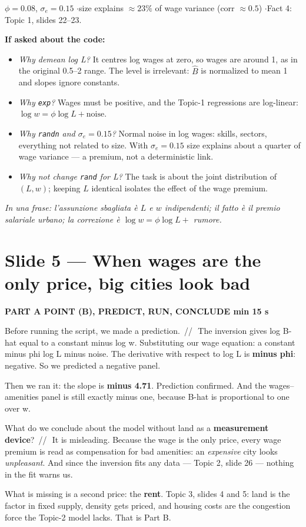 \documentclass[11pt,a4paper]{article}
\newcommand{\slide}[3]{\Needspace{14\baselineskip}\section{#1}\textcolor{unicared}{\small\bfseries\MakeUppercase{#3}\quad\textperiodcentered\quad #2}\par}
\newcommand{\idea}[1]{\par{\small\itshape\color{unicablue}In una frase: #1}\par}
\newcommand{\pause}{\textcolor{unicared}{\,/\!/\,}}
\begin{document}
\begin{nums}
$\phi = 0.08$, $\sigma_e = 0.15$ \quad$\cdot$\quad size explains $\approx 23\%$ of wage variance (corr $\approx 0.5$) \quad$\cdot$\quad Fact 4: Topic 1, slides 22--23.
\end{nums}
\begin{ask}
\textbf{If asked about the code:}
\begin{itemize}[leftmargin=12pt,itemsep=2pt,topsep=2pt]
\item \emph{Why demean log L?} It centres log wages at zero, so wages are around 1, as in the original 0.5--2 range. The level is irrelevant: $\hat B$ is normalized to mean 1 and slopes ignore constants.
\item \emph{Why \texttt{exp}?} Wages must be positive, and the Topic-1 regressions are log-linear: $\log w = \phi\log L + \text{noise}$.
\item \emph{Why \texttt{randn} and $\sigma_e = 0.15$?} Normal noise in log wages: skills, sectors, everything not related to size. With $\sigma_e = 0.15$ size explains about a quarter of wage variance --- a premium, not a deterministic link.
\item \emph{Why not change \texttt{rand} for L?} The task is about the joint distribution of $(L,w)$; keeping $L$ identical isolates the effect of the wage premium.
\end{itemize}
\end{ask}
\idea{l'assunzione sbagliata è $L$ e $w$ indipendenti; il fatto è il premio salariale urbano; la correzione è $\log w = \phi\log L + $ rumore.}

\slide{Slide 5 --- When wages are the only price, big cities look bad}{1 min 15 s}{Part A \textperiodcentered{} point (b), predict, run, conclude}

\begin{say}
Before running the script, we made a prediction. \pause\ The inversion gives log B-hat equal to a constant minus log w. Substituting our wage equation: a constant minus phi log L minus noise. The derivative with respect to log L is \textbf{minus phi}: negative. So we predicted a negative panel.

Then we ran it: the slope is \textbf{minus 4.71}. Prediction confirmed. And the wages--amenities panel is still exactly minus one, because B-hat is proportional to one over w.

What do we conclude about the model without land as a \textbf{measurement device}? \pause\ It is misleading. Because the wage is the only price, every wage premium is read as compensation for bad amenities: an \emph{expensive} city looks \emph{unpleasant}. And since the inversion fits any data --- Topic 2, slide 26 --- nothing in the fit warns us.

What is missing is a second price: the \textbf{rent}. Topic 3, slides 4 and 5: land is the factor in fixed supply, density gets priced, and housing costs are the congestion force the Topic-2 model lacks. That is Part B.
\end{say}
\end{document}
